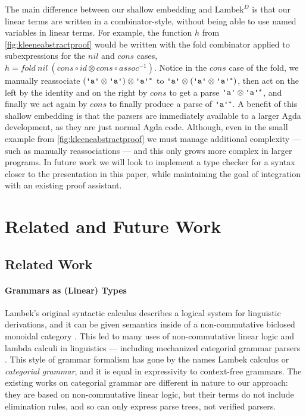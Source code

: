 \documentclass[acmsmall,nonacm]{acmart}
\newcommand{\theoryabbv}{$\textrm{Lambek}^D$\xspace}
\newcommand{\literal}[1]{\texttt{\textquotesingle#1\textquotesingle}}
\begin{document}
{The main difference
between our shallow embedding and \theoryabbv is that our linear terms
are written in a combinator-style, without being able to use named
variables in linear terms. For example, the function $h$ from
\cref{fig:kleeneabstractproof} would be written with the fold combinator applied
to subexpressions for the $nil$ and $cons$ cases,
\(
h = fold~nil~(cons \circ id \otimes cons \circ assoc^{-1})
\). Notice in the $cons$ case of the fold, we manually reassociate
$(\literal{a} \otimes \literal{a}) \otimes \literal{a}^{*}$ to
$\literal{a} \otimes (\literal{a} \otimes \literal{a}^{*})$, then act on the
left by the identity and on the right by $cons$ to get a parse
$\literal{a} \otimes \literal{a}^{*}$, and finally we act again by $cons$ to
finally produce a parse of $\literal{a}^{*}$.
A benefit of this shallow embedding is that
the parsers are immediately available to a larger Agda development, as
they are just normal Agda code. Although, even in the small example from
\cref{fig:kleeneabstractproof} we must manage additional complexity --- such as
manually reassociations --- and
this only grows more complex in larger programs. In future work we will look to
implement a type checker for a syntax closer to the presentation in
this paper, while maintaining the goal of integration with an
existing proof assistant.

\section{Related and Future Work}
\label{sec:discussion}

\subsection{Related Work}
\paragraph{Grammars as (Linear) Types}
Lambek's original syntactic calculus \cite{lambek58} describes a
logical system for linguistic derivations, and it can be given
semantics inside of a non-commutative biclosed monoidal category
\cite{lambek1988categorial}. This led to many uses of non-commutative
linear logic and lambda calculi in linguistics
\cite{buszkowskiTypeLogicsGrammar2003} --- including mechanized
categorial grammar parsers \cite{Guillaume2024,ranta-2011}. This style
of grammar formalism has gone by the names Lambek calculus or
\emph{categorial grammar}, and it is equal in expressivity to
context-free grammars.  The existing works on categorial grammar are
different in nature to our approach: they are based on non-commutative
linear logic, but their terms do not include elimination rules, and so
can only express parse trees, not verified parsers.

}
\end{document}
